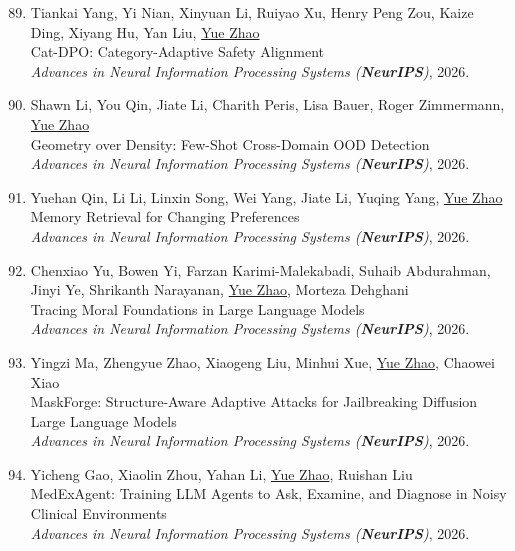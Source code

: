 \documentclass[margin,line,pifont,palatino,courier]{res}
\newenvironment{benumerate}[1]{
    \let\oldItem\item
    \def\item{\addtocounter{enumi}{-2}\oldItem}
    \begin{enumerate}[leftmargin=0.25in,label=\textcolor{uscred}{\arabic*.}]
    \setcounter{enumi}{#1}
    \addtocounter{enumi}{1}
}{
    \end{enumerate}
}
\begin{document}
\begin{resume}
\begin{benumerate}{88}
    \item
    Tiankai Yang, Yi Nian, Xinyuan Li, Ruiyao Xu, Henry Peng Zou, Kaize Ding, Xiyang Hu, Yan Liu, \underline{Yue Zhao}\\
    Cat-DPO: Category-Adaptive Safety Alignment\\
    \textit{Advances in Neural Information Processing Systems (\textbf{NeurIPS})}, 2026.

    \item
    Shawn Li, You Qin, Jiate Li, Charith Peris, Lisa Bauer, Roger Zimmermann, \underline{Yue Zhao}\\
    Geometry over Density: Few-Shot Cross-Domain OOD Detection\\
    \textit{Advances in Neural Information Processing Systems (\textbf{NeurIPS})}, 2026.

    \item
    Yuehan Qin, Li Li, Linxin Song, Wei Yang, Jiate Li, Yuqing Yang, \underline{Yue Zhao}\\
    Memory Retrieval for Changing Preferences\\
    \textit{Advances in Neural Information Processing Systems (\textbf{NeurIPS})}, 2026.

    \item
    Chenxiao Yu, Bowen Yi, Farzan Karimi-Malekabadi, Suhaib Abdurahman,\\
    Jinyi Ye, Shrikanth Narayanan, \underline{Yue Zhao}, Morteza Dehghani\\
    Tracing Moral Foundations in Large Language Models\\
    \textit{Advances in Neural Information Processing Systems (\textbf{NeurIPS})}, 2026.

    \item
    Yingzi Ma, Zhengyue Zhao, Xiaogeng Liu, Minhui Xue, \underline{Yue Zhao}, Chaowei Xiao\\
    MaskForge: Structure-Aware Adaptive Attacks for Jailbreaking Diffusion Large Language Models\\
    \textit{Advances in Neural Information Processing Systems (\textbf{NeurIPS})}, 2026.

    \item
    Yicheng Gao, Xiaolin Zhou, Yahan Li, \underline{Yue Zhao}, Ruishan Liu\\
    MedExAgent: Training LLM Agents to Ask, Examine, and Diagnose in Noisy Clinical Environments\\
    \textit{Advances in Neural Information Processing Systems (\textbf{NeurIPS})}, 2026.


\end{benumerate}
\end{resume}
\end{document}
